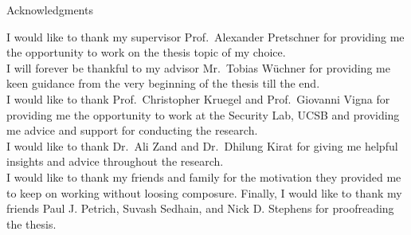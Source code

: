 \thispagestyle{empty}

\vspace*{2cm}

\begin{center}
{ Acknowledgments}
\end{center}

\vspace{1cm}

I would like to thank my supervisor Prof.\ Alexander Pretschner for providing me the opportunity to work on the thesis topic of my choice.\\
I will forever be thankful to my advisor Mr.\ Tobias Wüchner for providing me keen guidance from the very beginning of the thesis till the end.\\

I would like to thank Prof.\ Christopher Kruegel and Prof.\ Giovanni Vigna for providing me the opportunity to work at the Security Lab, UCSB and providing me advice and support for conducting the research.\\
I would like to thank Dr.\ Ali Zand and Dr.\ Dhilung Kirat for giving me helpful insights and advice throughout the research.\\

I would like to thank my friends and family for the motivation they provided me to keep on working without loosing composure.
Finally, I would like to thank my friends Paul J. Petrich, Suvash Sedhain, and Nick D. Stephens for proofreading the thesis.

\cleardoublepage{}
